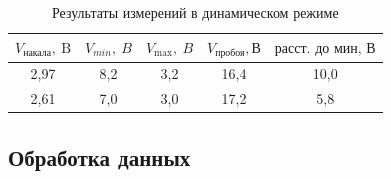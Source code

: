 \documentclass[a4paper, 12pt]{article}%
\begin{document}
\begin{table}[!h] \begin{center}
	\begin{tabular}{|c|c|c|c|c|}
		\hline$V_{\text{накала}}, \mathrm{~B}$ & $V_{min},\ B$ & $V_{\text{max}},\ B$ & $V_{\text {пробоя}}, \text{В}$ & $\text{расст. до мин, В}$\\
		\hline 2,97 & 8,2 & 3,2 & 16,4 & 10,0 \\
		\hline 2,61 & 7,0 & 3,0 & 17,2  & 5,8 \\
		\hline
	\end{tabular}
\caption{Результаты измерений в динамическом режиме}
\end{center} \end{table}	




\newpage	

\subsection{Обработка данных}
\end{document}

